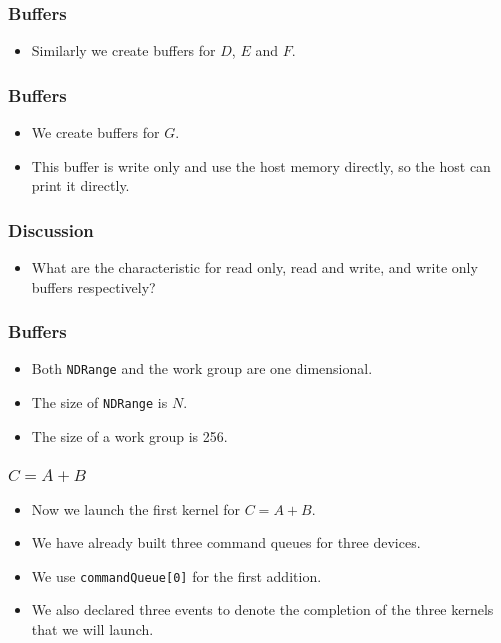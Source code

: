 \documentclass{beamer}
\begin{document}
\begin{frame}
  \frametitle{Buffers}
  \begin{itemize}
    \item Similarly we create buffers for $D$, $E$ and $F$.
  \end{itemize}
\end{frame}

\begin{frame}
\end{frame}

\begin{frame}
  \frametitle{Buffers}
  \begin{itemize}
    \item We create buffers for $G$.
    \item This buffer is write only and use the host memory directly,
      so the host can print it directly.
  \end{itemize}
\end{frame}

\begin{frame}
\end{frame}

\begin{frame}
  \frametitle{Discussion}
  \begin{itemize}
    \item What are the characteristic for read only, read and write,
      and write only buffers respectively?
  \end{itemize}
\end{frame}

\begin{frame}
  \frametitle{Buffers}
  \begin{itemize}
    \item Both {\tt NDRange} and the work group are one dimensional.
    \item The size of {\tt NDRange} is $N$.
    \item The size of a work group is 256.
  \end{itemize}
\end{frame}

\begin{frame}
\end{frame}

\begin{frame}
  \frametitle{$C = A + B$}
  \begin{itemize}
    \item Now we launch the first kernel for $C = A + B$.
    \item We have already built three command queues for three devices.  
    \item We use {\tt commandQueue[0]} for the first addition.
    \item We also declared three events to denote the completion of
      the three kernels that we will launch.
  \end{itemize}
\end{frame}
\end{document}
